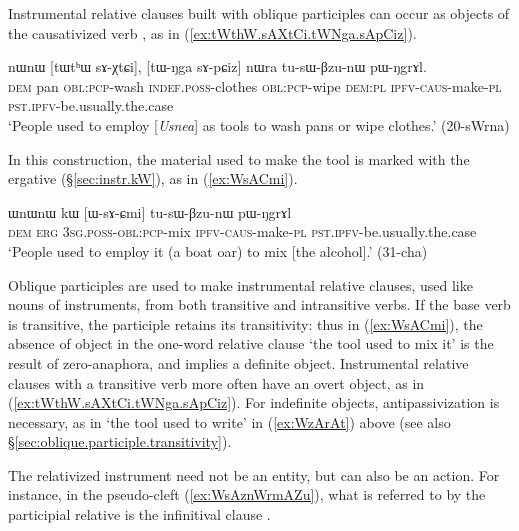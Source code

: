 Instrumental relative clauses built with oblique participles can occur as objects of the causativized verb , as in (\ref{ex:tWthW.sAXtCi.tWNga.sApCiz}).

\begin{exe}
\ex \label{ex:tWthW.sAXtCi.tWNga.sApCiz}
\gll nɯnɯ [tɯtʰɯ sɤ-χtɕi], [tɯ-ŋga sɤ-pɕiz] nɯra tu-sɯ-βzu-nɯ pɯ-ŋgrɤl. \\
\textsc{dem} pan \textsc{obl}:\textsc{pcp}-wash \textsc{indef}.\textsc{poss}-clothes \textsc{obl}:\textsc{pcp}-wipe \textsc{dem}:\textsc{pl} \textsc{ipfv}-\textsc{caus}-make-\textsc{pl} \textsc{pst}.\textsc{ipfv}-be.usually.the.case \\
\glt `People used to employ [\textit{Usnea}] as tools to wash pans or wipe clothes.' (20-sWrna) 
\end{exe} 

In this construction, the material used to make the tool is marked with the ergative (§\ref{sec:instr.kW}), as in (\ref{ex:WsACmi}).

\begin{exe}
\ex \label{ex:WsACmi}
\gll ɯnɯnɯ kɯ [ɯ-sɤ-ɕmi] tu-sɯ-βzu-nɯ pɯ-ŋgrɤl \\
\textsc{dem} \textsc{erg} \textsc{3sg}.\textsc{poss}-\textsc{obl}:\textsc{pcp}-mix \textsc{ipfv}-\textsc{caus}-make-\textsc{pl} \textsc{pst}.\textsc{ipfv}-be.usually.the.case \\
\glt `People used to employ it (a boat oar) to mix [the alcohol].' (31-cha) 	
\end{exe}  

Oblique participles are used to make instrumental relative clauses, used like nouns of instruments, from both transitive and intransitive verbs. If the base verb is transitive, the participle retains its transitivity: thus in (\ref{ex:WsACmi}), the absence of object in the one-word relative clause  `the tool used to mix it' is the result of zero-anaphora, and implies a definite object. Instrumental relative clauses with a transitive verb more often have an overt object, as in (\ref{ex:tWthW.sAXtCi.tWNga.sApCiz}). For indefinite objects, antipassivization is necessary, as in  `the tool used to write' in (\ref{ex:WzArAt}) above (see also  §\ref{sec:oblique.participle.transitivity}). 

The relativized instrument need not be an entity, but can also be an action. For instance, in the pseudo-cleft (\ref{ex:WsAznWrmAZu}), what is referred to by the participial relative is the infinitival clause .

